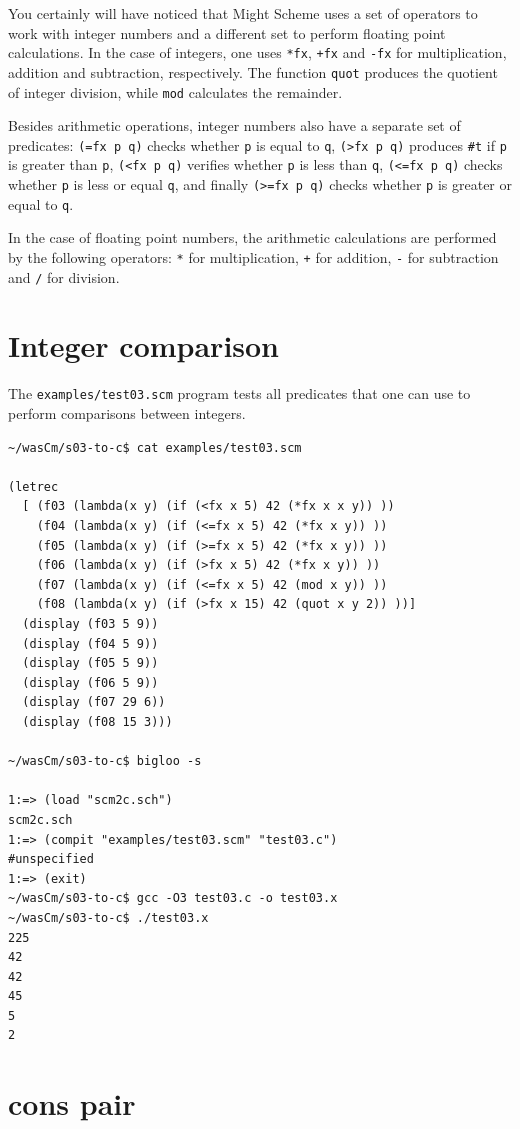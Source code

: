 \documentclass[a4paper,12pt]{book}
\begin{document}
You certainly will have noticed that Might Scheme
uses a set of operators to work with integer
numbers and a different set to perform floating
point calculations. In the case of integers,
one uses \verb|*fx|, \verb|+fx| and \verb|-fx|
for multiplication, addition and subtraction,
respectively. The function \verb|quot| produces
the quotient of integer division, while \verb|mod|
calculates the remainder.

Besides arithmetic operations, integer numbers
also have a separate set of predicates:
\verb|(=fx p q)| checks whether \verb|p| is
equal to \verb|q|, \verb|(>fx p q)| produces
\verb|#t| if \verb|p| is greater than \verb|p|,
\verb|(<fx p q)| verifies whether \verb|p| is
less than \verb|q|, \verb|(<=fx p q)| checks
whether \verb|p| is less or equal \verb|q|,
and finally \verb|(>=fx p q)| checks whether
\verb|p| is greater or equal to \verb|q|.

In the case of floating point numbers, the
arithmetic calculations are performed by
the following operators: \verb|*| for
multiplication, \verb|+| for addition,
\verb|-| for subtraction and \verb|/| for
division.

\section{Integer comparison}

The \verb|examples/test03.scm| program tests
all predicates that one can use to perform
comparisons between integers.

\begin{verbatim}
~/wasCm/s03-to-c$ cat examples/test03.scm 

(letrec 
  [ (f03 (lambda(x y) (if (<fx x 5) 42 (*fx x x y)) ))
    (f04 (lambda(x y) (if (<=fx x 5) 42 (*fx x y)) ))
    (f05 (lambda(x y) (if (>=fx x 5) 42 (*fx x y)) ))
    (f06 (lambda(x y) (if (>fx x 5) 42 (*fx x y)) ))
    (f07 (lambda(x y) (if (<=fx x 5) 42 (mod x y)) ))
    (f08 (lambda(x y) (if (>fx x 15) 42 (quot x y 2)) ))]
  (display (f03 5 9)) 
  (display (f04 5 9))
  (display (f05 5 9))
  (display (f06 5 9))
  (display (f07 29 6))
  (display (f08 15 3)))

~/wasCm/s03-to-c$ bigloo -s

1:=> (load "scm2c.sch")
scm2c.sch
1:=> (compit "examples/test03.scm" "test03.c")
#unspecified
1:=> (exit)
~/wasCm/s03-to-c$ gcc -O3 test03.c -o test03.x
~/wasCm/s03-to-c$ ./test03.x 
225
42
42
45
5
2
\end{verbatim}

\section{cons pair}
\end{document}
